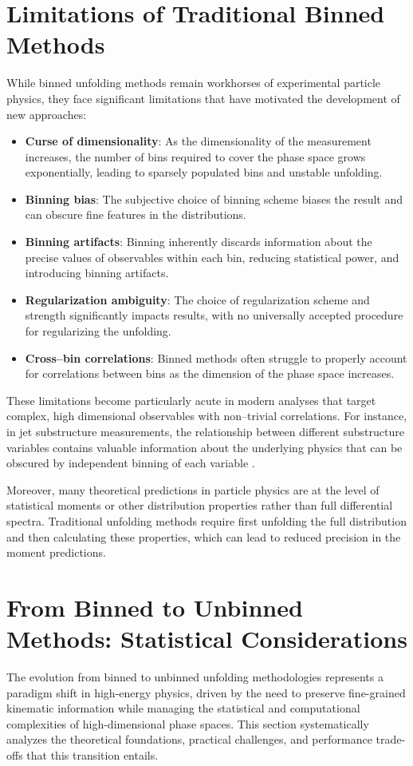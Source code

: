 \section{Limitations of Traditional Binned Methods}

While binned unfolding methods remain workhorses of experimental particle physics, they face significant limitations that have motivated the development of new approaches:

\begin{itemize}
\item \textbf{Curse of dimensionality}: As the dimensionality of the measurement increases, the number of bins required to cover the phase space grows exponentially, leading to sparsely populated bins and unstable unfolding.
\item \textbf{Binning bias}: The subjective choice of binning scheme biases the result and can obscure fine features in the distributions.
\item \textbf{Binning artifacts}: Binning inherently discards information about the precise values of observables within each bin, reducing statistical power, and introducing binning artifacts.
\item \textbf{Regularization ambiguity}: The choice of regularization scheme and strength significantly impacts results, with no universally accepted procedure for regularizing the unfolding.
\item \textbf{Cross--bin correlations}: Binned methods often struggle to properly account for correlations between bins as the dimension of the phase space increases.
\end{itemize}
These limitations become particularly acute in modern analyses that target complex, high dimensional observables with non--trivial correlations.
%
For instance, in jet substructure measurements, the relationship between different substructure variables contains valuable information about the underlying physics that can be obscured by independent binning of each variable .

Moreover, many theoretical predictions in particle physics are at the level of statistical moments or other distribution properties rather than full differential spectra.
%
Traditional unfolding methods require first unfolding the full distribution and then calculating these properties, which can lead to reduced precision in the moment predictions.


\section{From Binned to Unbinned Methods: Statistical Considerations}  
The evolution from binned to unbinned unfolding methodologies represents a paradigm shift in high-energy physics, driven by the need to preserve fine-grained kinematic information while managing the statistical and computational complexities of high-dimensional phase spaces. This section systematically analyzes the theoretical foundations, practical challenges, and performance trade-offs that this transition entails.

